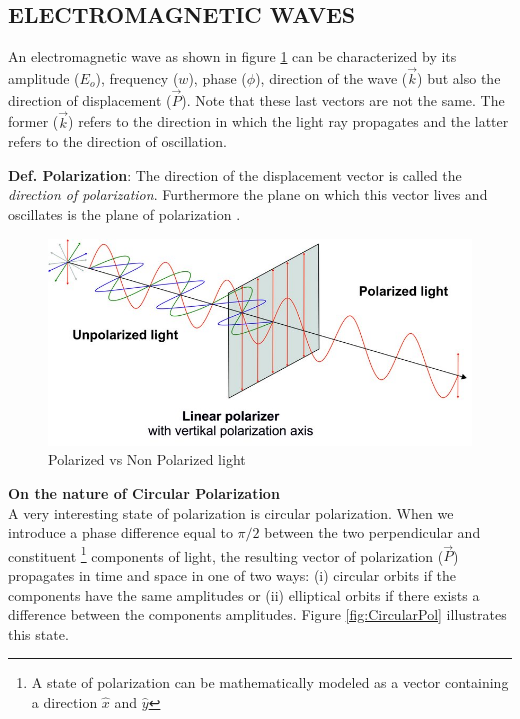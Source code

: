 \label{sec:TEO_FRAMEWORK}
\subsection{ELECTROMAGNETIC WAVES}
An electromagnetic wave as shown in figure \ref{fig:PolvNPol} can be characterized by its amplitude ($E_o$), frequency ($w$), phase ($\phi$), direction of the wave ($\Vec{k}$) but also the direction of displacement ($\Vec{P}$). Note that these last vectors are not the same. The former ($\Vec{k}$) refers to the direction in which the light ray propagates and the latter refers to the direction of oscillation. 

\textbf{Def. Polarization}: The direction of the displacement vector is called the \textit{direction of polarization}. Furthermore the plane on which this vector lives and oscillates is the plane of polarization \cite{guenther2015modern}. 
\begin{figure}[H]
    \centering
    \includegraphics[scale=0.80]{Figures/Polarization_NonPolarization.jpg}
    \caption{Polarized vs Non Polarized light}
    \label{fig:PolvNPol}
\end{figure}

\textbf{On the nature of Circular Polarization}\\
A very interesting state of polarization is circular polarization. When we introduce a phase difference equal to $\pi/2$ between the two perpendicular and constituent \footnote{A state of polarization can be mathematically modeled as a vector containing a direction $\hat{x}$ and $\hat{y}$} components of light, the resulting vector of polarization ($\Vec{P}$) propagates in time and space in one of two ways: (i) circular orbits if the components have the same amplitudes or (ii) elliptical orbits if there exists a difference between the components amplitudes. Figure \ref{fig:CircularPol} illustrates this state.

